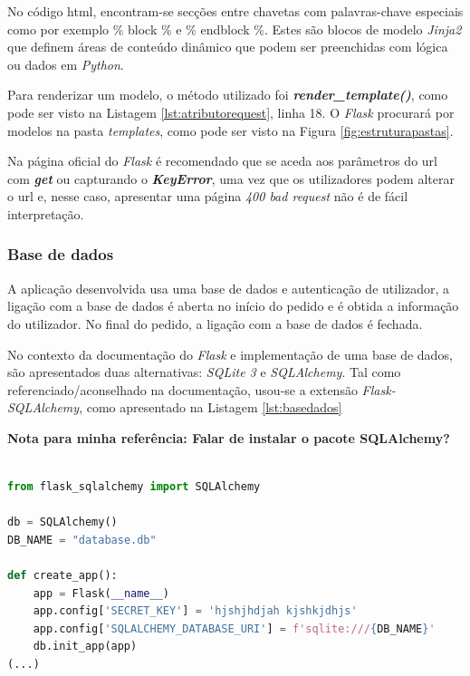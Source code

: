 No código \acrshort{html}, encontram-se secções entre chavetas {} com palavras-chave especiais como por exemplo {\% block \%} e {\% endblock \%}. Estes são blocos de modelo \textit{Jinja2} que definem áreas de conteúdo dinâmico que podem ser preenchidas com lógica ou dados em \textit{Python}.

Para renderizar um modelo, o método utilizado foi \textit{\textbf{render\_template()}}, como pode ser visto na Listagem \ref{lst:atributorequest}, linha 18. O \textit{Flask} procurará por modelos na pasta \textit{templates}, como pode ser visto na Figura \ref{fig:estruturapastas}.

Na página oficial do \textit{Flask} é recomendado que se aceda aos parâmetros do \acrshort{url} com \textit{\textbf{get}} ou capturando o \textit{\textbf{KeyError}}, uma vez que os utilizadores podem alterar o \acrshort{url} e, nesse caso, apresentar uma página \textit{400 bad request} não é de fácil interpretação.

\subsubsection{Base de dados}
A aplicação desenvolvida usa uma base de dados e autenticação de utilizador, a ligação com a base de dados é aberta no início do pedido e é obtida a informação do utilizador. No final do pedido, a ligação com a base de dados é fechada.

No contexto da documentação do \textit{Flask} e implementação de uma base de dados, são apresentados duas alternativas: \textit{SQLite 3} e \textit{SQLAlchemy}. Tal como referenciado/aconselhado na documentação, usou-se a extensão \textit{Flask-SQLAlchemy}, como apresentado na Listagem \ref{lst:basedados}

\textbf{Nota para minha referência: Falar de instalar o pacote SQLAlchemy?}

\begin{minipage}{0.9\linewidth}
	\begin{lstlisting}[language=Python, caption=Exemplo uso \textit{SQLAlchemy} - \textit{\_\_init.py\_\_}, label=lst:basedados]

from flask_sqlalchemy import SQLAlchemy

db = SQLAlchemy()
DB_NAME = "database.db"

def create_app():
    app = Flask(__name__)
    app.config['SECRET_KEY'] = 'hjshjhdjah kjshkjdhjs'
    app.config['SQLALCHEMY_DATABASE_URI'] = f'sqlite:///{DB_NAME}'
    db.init_app(app)
(...)
\end{lstlisting}
\end{minipage}

